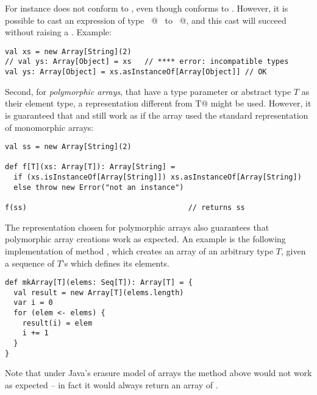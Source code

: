 For instance  does not conform to
, even though  conforms to .
However, it is possible to cast an expression of type
~\lstinline@Array[String]@~ to ~\lstinline@Array[Object]@, and this
cast will succeed without raising a . Example:
\begin{lstlisting}
val xs = new Array[String](2)
// val ys: Array[Object] = xs   // **** error: incompatible types
val ys: Array[Object] = xs.asInstanceOf[Array[Object]] // OK
\end{lstlisting}

Second, for {\em polymorphic arrays}, that have a type parameter or
abstract type $T$ as their element type, a representation different
from
\lstinline@[]T@ might be used. However, it is guaranteed that 
 and  still work as if the array 
used the standard representation of monomorphic arrays:
\begin{lstlisting}
val ss = new Array[String](2)

def f[T](xs: Array[T]): Array[String] = 
  if (xs.isInstanceOf[Array[String]]) xs.asInstanceOf[Array[String])
  else throw new Error("not an instance")

f(ss)                                     // returns ss
\end{lstlisting}
The representation chosen for polymorphic arrays also guarantees that
polymorphic array creations work as expected. An example is the
following implementation of method \lstinline@mkArray@, which creates
an array of an arbitrary type $T$, given a sequence of $T$'s which
defines its elements.
\begin{lstlisting}
def mkArray[T](elems: Seq[T]): Array[T] = {
  val result = new Array[T](elems.length)
  var i = 0
  for (elem <- elems) {
    result(i) = elem
    i += 1
  }
}
\end{lstlisting}
Note that under Java's erasure model of arrays the method above would
not work as expected -- in fact it would always return an array of
\lstinline@Object@.

